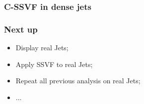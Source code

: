 \documentclass{beamer}
\begin{document}
\begin{frame}
    \frametitle{C-SSVF in dense jets}
\end{frame}

\begin{frame}
    \frametitle{Next up}
    \begin{itemize}
        \item<1-> Display real Jets;
        \item<2-> Apply SSVF to real Jets;
        \item<3-> Repeat all previous analysis on real Jets;
        \item<4-> ... 
    \end{itemize}
\end{frame}
\end{document}
